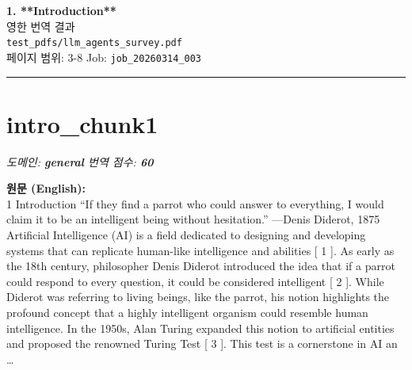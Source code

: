 \documentclass[12pt,a4paper]{article}
\begin{document}
\begin{center}
{\LARGE\bfseries\color{headercolor} 1. **Introduction**}\\[0.5em]
{\large 영한 번역 결과}\\[0.3em]
{\normalsize\texttt{test\_pdfs/llm\_agents\_survey.pdf}}\\
{\small 페이지 범위: 3-8 \quad Job: \texttt{job\_20260314\_003}}
\end{center}
\vspace{1em}
\hrule
\vspace{1em}
\tableofcontents
\newpage

\section{intro\_chunk1}
\noindent\textit{\small 도메인: \textbf{general} \quad 번역 점수: \textbf{\color{orange!80!black}60}}
\vspace{0.5em}

\begin{mdframed}[style=orig]
\noindent\textbf{\small 원문 (English):}\\[2pt]
\small 1 Introduction “If they find a parrot who could answer to everything, I would claim it to be an intelligent being without hesitation.” —Denis Diderot, 1875 Artificial Intelligence (AI) is a field dedicated to designing and developing systems that can replicate human-like intelligence and abilities [ 1 ]. As early as the 18th century, philosopher Denis Diderot introduced the idea that if a parrot could respond to every question, it could be considered intelligent [ 2 ]. While Diderot was referring to living beings, like the parrot, his notion highlights the profound concept that a highly intelligent organism could resemble human intelligence. In the 1950s, Alan Turing expanded this notion to artificial entities and proposed the renowned Turing Test [ 3 ]. This test is a cornerstone in AI an \ldots
\end{mdframed}
\vspace{0.4em}
\end{document}
